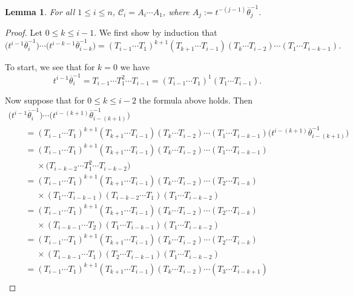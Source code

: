 \documentclass[10pt,a4paper]{amsart}
\numberwithin{equation}{section}
\newtheorem{Lemma}[Theorem]{Lemma}
\theoremstyle{definition}
\begin{document}
\begin{Lemma}\label{creation operators Lemma}
 For all $1 \leq i \leq n$,
$\mathscr{C}_i = A_i\cdots A_1$, where $A_j:= t^{-(j-1)}\overline{\theta}_j^{-1}$.
\end{Lemma}
\begin{proof}
 Let $0 \leq k \leq i-1$. We first show by induction that
 \[
 \bigl(t^{i-1}\overline{\theta}_{i}^{-1}\bigr)\cdots \bigl(t^{i-k-1}\overline{\theta}_{i-k}^{-1}\bigr) = (T_{i-1}\cdots T_1)^{k+1} (T_{k+1}\cdots T_{i-1})(T_k\cdots T_{i-2})\cdots (T_1\cdots T_{i-k-1}).
 \]

 To start, we see that for $k=0$ we have
 \[
 t^{i-1}\overline{\theta}_{i}^{-1} = T_{i-1}\cdots T_1^2 \cdots T_{i-1} = (T_{i-1}\cdots T_1)^{1} (T_1\cdots T_{i-1}).
 \]

 Now suppose that for $0 \leq k \leq i-2$ the formula above holds. Then
 \begin{gather*}
 \bigl(t^{i-1}\overline{\theta}_{i}^{-1}\bigr)\cdots \bigl(t^{i-(k+1)}\overline{\theta}_{i-(k+1)}^{-1}\bigr) \\
 \qquad = (T_{i-1}\cdots T_1)^{k+1} (T_{k+1}\cdots T_{i-1})(T_k\cdots T_{i-2})\cdots (T_1\cdots T_{i-k-1})\bigl(t^{i-(k+1)}\overline{\theta}_{i-(k+1)}^{-1}\bigr) \\
 \qquad = (T_{i-1}\cdots T_1)^{k+1} (T_{k+1}\cdots T_{i-1})(T_k\cdots T_{i-2})\cdots (T_1\cdots T_{i-k-1})\\
 \phantom{ \qquad = }{} \times\bigl(T_{i-k-2}\cdots T_1^2 \cdots T_{i-k-2}\bigr) \\
 \qquad = (T_{i-1}\cdots T_1)^{k+1} (T_{k+1}\cdots T_{i-1})(T_k\cdots T_{i-2})\cdots (T_2\cdots T_{i-k}) \\
 \phantom{ \qquad = }{} \times (T_1\cdots T_{i-k-1}) (T_{i-k-2}\cdots T_1)(T_1 \cdots T_{i-k-2}) \\
 \qquad = (T_{i-1}\cdots T_1)^{k+1} (T_{k+1}\cdots T_{i-1})(T_k\cdots T_{i-2})\cdots (T_2\cdots T_{i-k}) \\
 \phantom{ \qquad = }{} \times (T_{i-k-1}\cdots T_{2})(T_{1}\cdots T_{i-k-1})(T_1 \cdots T_{i-k-2}) \\
 \qquad = (T_{i-1}\cdots T_1)^{k+1} (T_{k+1}\cdots T_{i-1})(T_k\cdots T_{i-2})\cdots (T_2\cdots T_{i-k}) \\
 \phantom{ \qquad = }{} \times (T_{i-k-1}\cdots T_{1})(T_{2}\cdots T_{i-k-1})(T_1 \cdots T_{i-k-2}) \\
 \qquad = (T_{i-1}\cdots T_1)^{k+1} (T_{k+1}\cdots T_{i-1})(T_k\cdots T_{i-2})\cdots (T_3\cdots T_{i-k+1}) \\

\end{gather*}
\end{proof}
\end{document}
